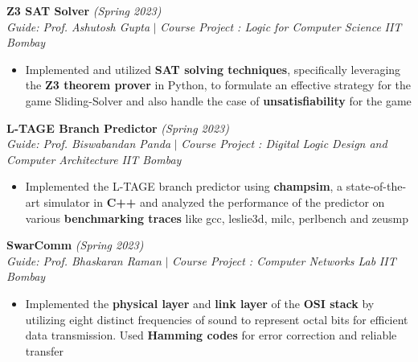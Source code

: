 \documentclass[a4paper,10pt]{article}
\begin{document}
\vspace{\baselineskip}
\vspace{-13pt}
\noindent\textbf{\large Z3 SAT Solver} \hfill{\sl \small (Spring 2023)}\\
{\it Guide: Prof. Ashutosh Gupta} $|$ {\it Course Project : Logic for Computer Science } \hfill{\it IIT Bombay}
\vspace{-2pt}
\begin{itemize}[itemsep = -0.65 mm, leftmargin=*]
    \item Implemented and utilized \textbf{SAT solving techniques}, specifically leveraging the \textbf{Z3 theorem prover} in Python, to formulate an effective strategy for the game Sliding-Solver and also handle the case of \textbf{unsatisfiability} for the game
\end{itemize}
\vspace{\baselineskip}
\vspace{-13pt}
\noindent\textbf{\large L-TAGE Branch Predictor} \hfill{\sl \small (Spring 2023)}\\
{\it Guide: Prof. Biswabandan Panda} $|$ {\it Course Project : Digital Logic Design and Computer Architecture } \hfill{\it IIT Bombay}
\vspace{-2pt}
\begin{itemize}[itemsep = -0.65 mm, leftmargin=*]
    \item Implemented the L-TAGE branch predictor using \textbf{champsim}, a state-of-the-art simulator in \textbf{C++} and analyzed the performance of the predictor on various \textbf{benchmarking traces} like gcc, leslie3d, milc, perlbench and zeusmp
\end{itemize}
\vspace{\baselineskip}
\vspace{-13pt}
\noindent\textbf{\large SwarComm} \hfill{\sl \small (Spring 2023)}\\
{\it Guide: Prof. Bhaskaran Raman} $|$ {\it Course Project : Computer Networks Lab} \hfill{\it IIT Bombay}
\vspace{-2pt}
\begin{itemize}[itemsep = -0.65 mm, leftmargin=*]
    \item Implemented the \textbf{physical layer} and \textbf{link layer} of the \textbf{OSI stack} by utilizing eight distinct frequencies of sound to represent octal bits for efficient data transmission. Used \textbf{Hamming codes} for error correction and reliable transfer
\end{itemize}
\vspace{\baselineskip}
\end{document}
